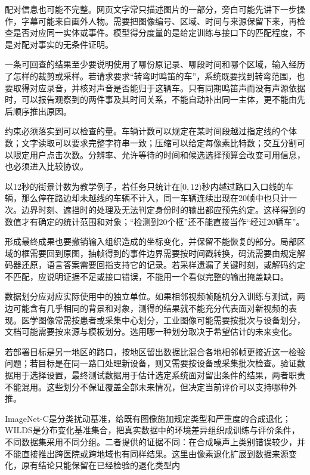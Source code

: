 配对信息也可能不完整。网页文字常只描述图片的一部分，旁白可能先讲下一步操作，字幕可能来自画外人物。需要把图像编号、区域、时间与来源保留下来，再检查是否对应同一实体或事件。模型得分度量的是给定训练与接口下的匹配程度，不是对配对事实的无条件证明。

一条可回查的结果至少要说明使用了哪份原记录、哪段时间和哪个区域，输入经历了怎样的裁剪或采样。若请求要求“转弯时鸣笛的车”，系统既要找到转弯范围，也要取得对应录音，并核对声音是否能归于这辆车。只有同期鸣笛声而没有声源依据时，可以报告观察到的两件事及其时间关系，不能自动补出同一主体，更不能由先后顺序推出原因。

约束必须落实到可以检查的量。车辆计数可以规定在某时间段越过指定线的个体数；文字读取可以要求完整字符串一致；压缩可以给定每像素比特数；交互分割可以限定用户点击次数。分辨率、允许等待的时间和候选选择预算会改变可用信息，也必须进入比较协议。

以12秒的街景计数为教学例子，若任务只统计在$[0,12)$秒内越过路口入口线的车辆，那么停在路边却未越线的车辆不计入，同一车辆连续出现在20帧中也只计一次。边界时刻、遮挡时的处理及无法判定身份时的输出都应预先约定。这样得到的数值才有确定的统计范围和对象；“检测到20个框”还不能直接当作“经过20辆车”。

形成最终成果也要撤销输入组织造成的坐标变化，并保留不能恢复的部分。局部区域的框需要回到原图，抽帧得到的事件边界需要按时间戳转换，码流需要由规定解码器还原，语言答案需要回指支持它的记录。若采样遗漏了关键时刻，或解码约定不匹配，应说明证据不足或接口错误，不能用一个看似完整的输出掩盖缺口。

数据划分应对应实际使用中的独立单位。如果相邻视频帧随机分入训练与测试，两边可能含有几乎相同的背景和对象，测得的结果就不能充分代表面对新视频的表现。医学图像常需按患者或采集中心划分，工业图像可能需要按批次与设备划分，文档可能需要按来源与模板划分。选用哪一种划分取决于希望估计的未来变化。

若部署目标是另一地区的路口，按地区留出数据比混合各地相邻帧更接近这一检验问题；若目标是在同一路口处理新设备，则又需要按设备或采集批次检查。验证数据用于选择设置，最终测试数据用于估计选定系统面对留出条件的结果，两者职责不能混用。这些划分不保证覆盖全部未来情况，但决定当前评价可以支持哪种外推。

ImageNet-C是分类扰动基准，给既有图像施加规定类型和严重度的合成退化；WILDS是分布变化基准集合，把真实数据中的环境差异组织成训练与评价条件，不同数据集采用不同分组。二者提供的证据不同：在合成噪声上类别错误较少，并不能直接推出跨医院或跨地域也有同样结果。这里由像素退化扩展到数据来源变化，原有结论只能保留在已经检验的退化类型内

